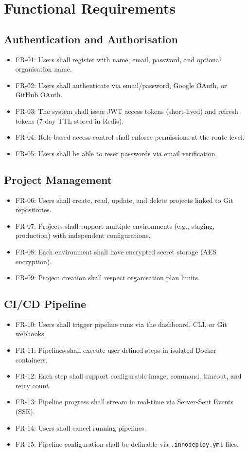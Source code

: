 \documentclass[12pt,a4paper,twoside]{report}
\begin{document}
\section{Functional Requirements}

\subsection{Authentication and Authorisation}
\begin{itemize}[noitemsep]
  \item FR-01: Users shall register with name, email, password, and optional organisation name.
  \item FR-02: Users shall authenticate via email/password, Google OAuth, or GitHub OAuth.
  \item FR-03: The system shall issue JWT access tokens (short-lived) and refresh tokens (7-day TTL stored in Redis).
  \item FR-04: Role-based access control shall enforce permissions at the route level.
  \item FR-05: Users shall be able to reset passwords via email verification.
\end{itemize}

\subsection{Project Management}
\begin{itemize}[noitemsep]
  \item FR-06: Users shall create, read, update, and delete projects linked to Git repositories.
  \item FR-07: Projects shall support multiple environments (e.g., staging, production) with independent configurations.
  \item FR-08: Each environment shall have encrypted secret storage (AES encryption).
  \item FR-09: Project creation shall respect organisation plan limits.
\end{itemize}

\subsection{CI/CD Pipeline}
\begin{itemize}[noitemsep]
  \item FR-10: Users shall trigger pipeline runs via the dashboard, CLI, or Git webhooks.
  \item FR-11: Pipelines shall execute user-defined steps in isolated Docker containers.
  \item FR-12: Each step shall support configurable image, command, timeout, and retry count.
  \item FR-13: Pipeline progress shall stream in real-time via Server-Sent Events (SSE).
  \item FR-14: Users shall cancel running pipelines.
  \item FR-15: Pipeline configuration shall be definable via \texttt{.innodeploy.yml} files.
\end{itemize}
\end{document}
